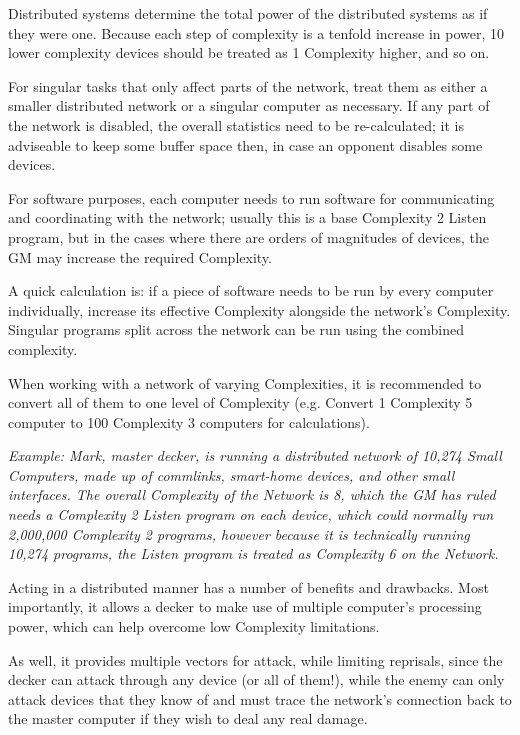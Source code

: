 \begin{multicols*}{3}
	Distributed systems determine the total power of the distributed systems as if they were one. Because each step of complexity is a tenfold increase in power, 10 lower complexity devices should be treated as 1 Complexity higher, and so on. 
	
	For singular tasks that only affect parts of the network, treat them as either a smaller distributed network or a singular computer as necessary. If any part of the network is disabled, the overall statistics need to be re-calculated; it is adviseable to keep some buffer space then, in case an opponent disables some devices.
	
	For software purposes, each computer needs to run software for communicating and coordinating with the network; usually this is a base Complexity 2 Listen program, but in the cases where there are orders of magnitudes of devices, the GM may increase the required Complexity.
	
	A quick calculation is: if a piece of software needs to be run by every computer individually, increase its effective Complexity alongside the network's Complexity. Singular programs split across the network can be run using the combined complexity.
	
	When working with a network of varying Complexities, it is recommended to convert all of them to one level of Complexity (e.g. Convert 1 Complexity 5 computer to 100 Complexity 3 computers for calculations).
	
	\textit{\textcolor{OliveGreen}{Example: Mark, master decker, is running a distributed network of 10,274 Small Computers, made up of commlinks, smart-home devices, and other small interfaces. The overall Complexity of the Network is 8, which the GM has ruled needs a Complexity 2 Listen program on each device, which could normally run 2,000,000 Complexity 2 programs, however because it is technically running 10,274 programs, the Listen program is treated as Complexity 6 on the Network.}}
	
	Acting in a distributed manner has a number of benefits and drawbacks. Most importantly, it allows a decker to make use of multiple computer's processing power, which can help overcome low Complexity limitations. 
	
	As well, it provides multiple vectors for attack, while limiting reprisals, since the decker can attack through any device (or all of them!), while the enemy can only attack devices that they know of and must trace the network's connection back to the master computer if they wish to deal any real damage. 
	

\end{multicols*}
